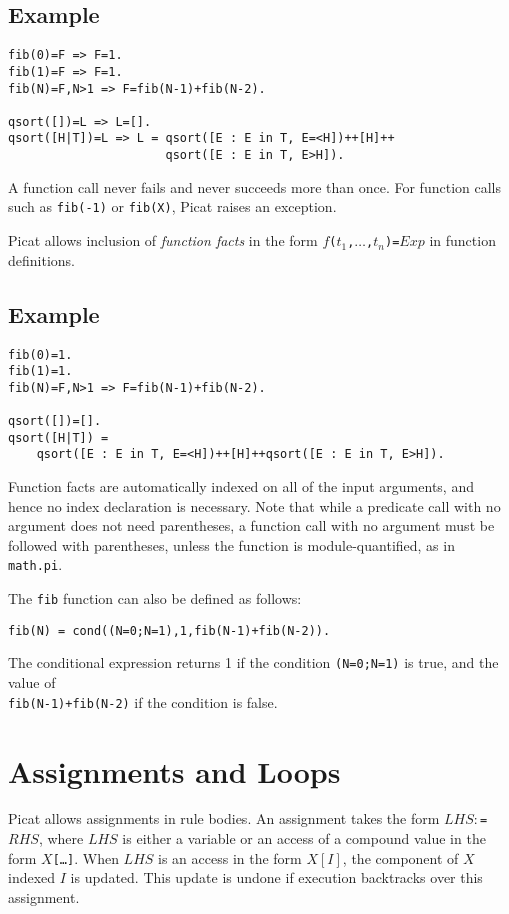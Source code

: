 \subsection*{Example}
\begin{verbatim}
fib(0)=F => F=1.
fib(1)=F => F=1.
fib(N)=F,N>1 => F=fib(N-1)+fib(N-2).

qsort([])=L => L=[].
qsort([H|T])=L => L = qsort([E : E in T, E=<H])++[H]++
                      qsort([E : E in T, E>H]).
\end{verbatim}
A function call never fails and never succeeds more than once. For function calls such as \texttt{fib(-1)} or \texttt{fib(X)}, Picat raises an exception. 

Picat allows inclusion of \emph{function facts} in the form {\tt $f$($t_1$,$\ldots$,$t_n$)\verb+=+$Exp$} in function definitions. 

\subsection*{Example}
\begin{verbatim}
fib(0)=1.    
fib(1)=1.
fib(N)=F,N>1 => F=fib(N-1)+fib(N-2).

qsort([])=[].
qsort([H|T]) =
    qsort([E : E in T, E=<H])++[H]++qsort([E : E in T, E>H]).
\end{verbatim}
Function facts are automatically indexed on all of the input arguments, and hence no index declaration is necessary. Note that while a predicate call with no argument does not need parentheses, a function call with no argument must be followed with parentheses, unless the function is module-quantified, as in \texttt{math.pi}.

The \texttt{fib} function can also be defined as follows:
\begin{verbatim}
fib(N) = cond((N=0;N=1),1,fib(N-1)+fib(N-2)).
\end{verbatim}
The conditional expression returns 1 if the condition \texttt{(N=0;N=1)} is true, and the value of \\ \texttt{fib(N-1)+fib(N-2)} if the condition is false.

\section{Assignments and Loops}
Picat allows assignments in rule bodies. An assignment takes the form $LHS $$:$\verb+=+$ RHS$, where $LHS$ is either a variable or an access of a compound value in the form \texttt{$X$[\ldots]}. When $LHS$ is an access in the form $X[I]$, the component of $X$ indexed $I$ is updated. This update is undone if execution backtracks over this assignment.

